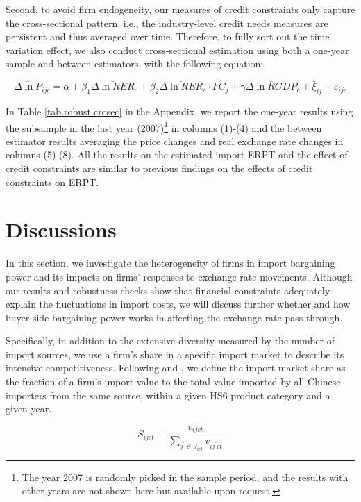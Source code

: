 Second, to avoid firm endogeneity, our measures of credit constraints only capture the cross-sectional pattern, i.e., the industry-level credit needs measures are persistent and thus averaged over time. Therefore, to fully sort out the time variation effect, we also conduct cross-sectional estimation using both a one-year sample and between estimators, with the following equation:

\begin{equation}
	\overline{\Delta \ln P}_{ijc}=\alpha+\beta_{1} \overline{\Delta \ln RER}_{c}+\beta_{2} \overline{\Delta \ln RER}_{c} \cdot FC_{j}+\gamma \overline{\Delta \ln RGDP}_{c}+\bar{\xi}_{ij} +\varepsilon_{ijc}
	\label{eq.credit.crosec}
\end{equation}

In Table \ref{tab.robust.crosec} in the Appendix, we report the one-year results using the subsample in the last year (2007)\footnote{The year 2007 is randomly picked in the sample period, and the results with other years are not shown here but available upon request.} in columns (1)-(4) and the between estimator results averaging the price changes and real exchange rate changes in columns (5)-(8). All the results on the estimated import ERPT and the effect of credit constraints are similar to previous findings on the effects of credit constraints on ERPT.

\section{Discussions} \label{Discussion}

In this section, we investigate the heterogeneity of firms in import bargaining power and its impacts on firms’ responses to exchange rate movements. Although our results and robustness checks show that financial constraints adequately explain the fluctuations in import costs, we will discuss further whether and how buyer-side bargaining power works in affecting the exchange rate pass-through.

Specifically, in addition to the extensive diversity measured by the number of import sources, we use a firm's share in a specific import market to describe its intensive competitiveness. Following \cite{aik2014} and \cite{devereux2017}, we define the import market share as the fraction of a firm's import value to the total value imported by all Chinese importers from the same source, within a given HS6 product category and a given year. 

$$
S_{ijct} \equiv \frac{v_{ijct}}{\sum_{j^{\prime} \in J_{ict}} v_{ij^{\prime}ct}}
$$

